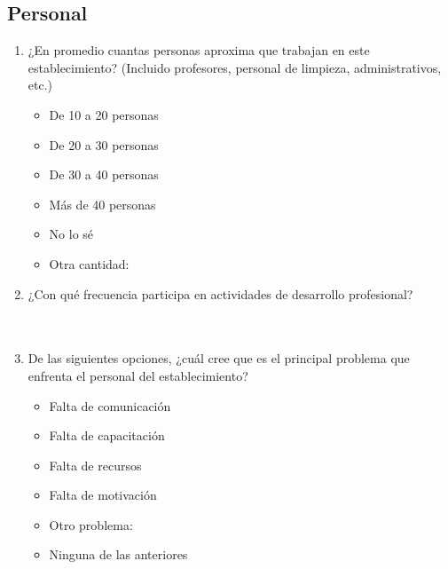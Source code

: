 \documentclass{article}
\begin{document}
\subsection*{Personal}
\begin{enumerate}
    \item ¿En promedio cuantas personas aproxima que trabajan en este establecimiento? (Incluido profesores, personal de limpieza, administrativos, etc.)
    \begin{itemize}[label=$\square$]
        \item De 10 a 20 personas
        \item De 20 a 30 personas
        \item De 30 a 40 personas
        \item Más de 40 personas
        \item No lo sé
        \item Otra cantidad: \underline{\hspace{0.5\linewidth}}
    \end{itemize}
    \item ¿Con qué frecuencia participa en actividades de desarrollo profesional? \\[0.5cm]
    \underline{\hspace{0.95\linewidth}} \vspace{0.3cm} \\
    \underline{\hspace{0.95\linewidth}} \vspace{0.3cm} \\
    \underline{\hspace{0.95\linewidth}} \vspace{0.3cm}
    \item De las siguientes opciones, ¿cuál cree que es el principal problema que enfrenta el personal del establecimiento?
    \begin{itemize}[label=$\square$]
        \item Falta de comunicación
        \item Falta de capacitación
        \item Falta de recursos
        \item Falta de motivación
        \item Otro problema: \underline{\hspace{0.5\linewidth}}
        \item Ninguna de las anteriores
    \end{itemize}
\end{enumerate}
\end{document}
